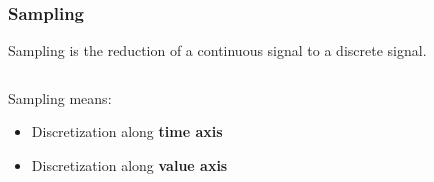 \begin{frame}
    \frametitle{Sampling}
    \begin{myDefinition}
        Sampling is the reduction of a continuous signal to a discrete signal.
    \end{myDefinition}

    \vspace{5mm}

    \begin{columns}[c, onlytextwidth]
        \begin{column}{0.4\textwidth}
            Sampling means:
            \begin{itemize}
                \item Discretization along \textbf<1>{time axis}
                \item Discretization along \textbf<2>{value axis}
            \end{itemize}
        \end{column}\begin{column}{0.6\textwidth}
        \end{column}
    \end{columns}


\end{frame}


